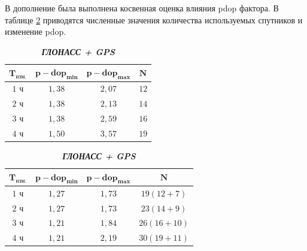В дополнение была выполнена косвенная оценка влияния pdop фактора. В таблице \cref{tab:tab21} приводятся численные значения количества используемых спутников и изменение pdop.

\begin{table} [htbp]
	\centering\small
		\label{tab:tab21}{%
			\begin{subtable}{.37\linewidth}	
				\centering
				\caption*{\textbf{\textit{GPS}}}
				\begin{tabular}{|c|c|c|c|}
					\hline
					$\mathbf{T_\text{изм.}}$	&$\mathbf{p-dop_{min}}$	&$\mathbf{p-dop_{max}}$	& $\mathbf{N}$ \\ \hline
					$1$ ч						& $ 1,38$				& $ 2,07$        		& $ 12$   \\ \hline
					$2$ ч						& $ 1,38$				& $ 2,13$        		& $ 14$   \\ \hline
					$3$ ч						& $ 1,38$				& $ 2,59$        		& $ 16$   \\ \hline
					$4$ ч						& $ 1,50$          		& $ 3,57$        		& $ 19$   \\ \hline
				\end{tabular}
			\end{subtable}%
			\qquad
			\begin{subtable}{.57\linewidth}	
				\centering
				\caption*{\textbf{\textit{ГЛОНАСС + GPS}}}
				\begin{tabular}{|c|c|c|c|}
					\hline
					$\mathbf{T_\text{изм.}}$	&$\mathbf{p-dop_{min}}$	&$\mathbf{p-dop_{max}}$	& $\mathbf{N}$	\\ \hline
					$1$ ч						& $ 1,27$				& $ 1,73$        		& $ 19(12+7)$	\\ \hline
					$2$ ч						& $ 1,27$				& $ 1,73$        		& $ 23(14+9)$	\\ \hline
					$3$ ч						& $ 1,21$				& $ 1,84$        		& $ 26(16+10)$	\\ \hline
					$4$ ч						& $ 1,21$          		& $ 2,19$        		& $ 30(19+11)$	\\ \hline
				\end{tabular}
			\end{subtable}%
		}
	\end{table}
	
